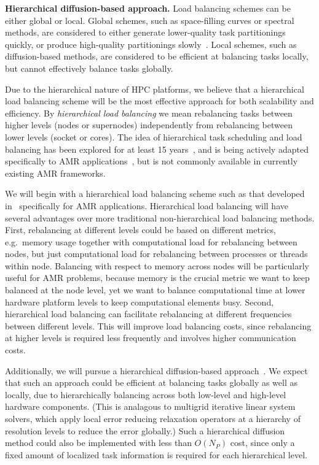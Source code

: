 \documentclass[10pt,twocolumn]{article}
\begin{document}
\textbf{Hierarchical diffusion-based approach.} Load balancing
schemes can be either global or local.  Global schemes, such as
space-filling curves or spectral methods, are considered to either
generate lower-quality task partitionings quickly, or produce
high-quality partitionings slowly~\cite{MeMo09}.  Local schemes,
such as diffusion-based methods, are considered to be efficient
at balancing tasks locally, but cannot effectively balance tasks
globally.

Due to the hierarchical nature of HPC platforms, we believe that a
hierarchical load balancing scheme will be the most effective approach
for both scalability and efficiency.  By \textit{hierarchical load
  balancing} we mean rebalancing tasks between higher levels (nodes or
supernodes) independently from rebalancing between lower levels
(socket or cores).  The idea of hierarchical task scheduling and load
balancing has been explored for at least 15 years~\cite{AhGh94}, and
is being actively adapted specifically to AMR
applications~\cite{LaTa06}, but is not commonly available in currently
existing AMR frameworks.

We will begin with a hierarchical load balancing scheme such as that
developed in~\cite{LaTa06} specifically for AMR applications.
Hierarchical load balancing will have several advantages over more
traditional non-hierarchical load balancing methods.  First,
rebalancing at different levels could be based on different metrics,
e.g.~memory usage together with computational load for rebalancing
between nodes, but just computational load for rebalancing between
processes or threads within node.  Balancing with respect to memory
across nodes will be particularly useful for AMR problems, because
memory is the crucial metric we want to keep balanced at the node
level, yet we want to balance computational time at lower hardware
platform levels to keep computational elements busy.  Second,
hierarchical load balancing can facilitate rebalancing at different
frequencies between different levels.  This will improve load
balancing costs, since rebalancing at higher levels is required less
frequently and involves higher communication costs.

\nocite{ScKa97}
Additionally, we will pursue a hierarchical diffusion-based
approach~\cite{MeMo09}.  We expect that such an approach could be
efficient at balancing tasks globally as well as locally, due to
hierarchically balancing across both low-level and high-level hardware
components.  (This is analagous to multigrid iterative linear system
solvers, which apply local error reducing relaxation operators at a
hierarchy of resolution levels to reduce the error globally.)  Such a
hierarchical diffusion method could also be implemented with less than
$O(N_P)$ cost, since only a fixed amount of localized task information
is required for each hierarchical level.
\end{document}
